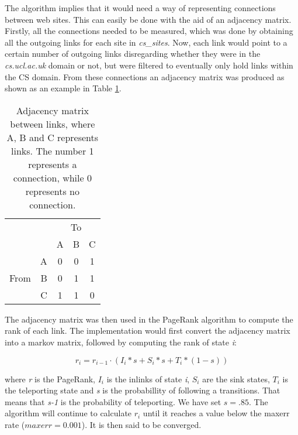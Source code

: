 The algorithm implies that it would need a way of representing connections between web sites. This can easily be done with the aid of an adjacency matrix. Firstly, all the connections needed to be measured, which was done by obtaining all the outgoing links for each site in \emph{cs\_sites}. Now, each link would point to a certain number of outgoing links disregarding whether they were in the \emph{cs.ucl.ac.uk} domain or not, but were filtered to eventually only hold links within the CS domain. From these connections an adjacency matrix was produced as shown as an example in Table \ref{fig:adj_mx}. 

\begin{table}[!h]
  \centering
  \begin{tabular}{|lr|c|c|c|} \cline{3-5}
  \multicolumn{1}{l}{} && \multicolumn{3}{c|}{To} \\ \cline{3-5}
  \multicolumn{1}{l}{} & & A & B & C  \\ \hline
  \multirow{3}{*}{\begin{sideways}From\end{sideways}}
  & \multicolumn{1}{|r|}{A} & 0 & 0 & 1  \\ \cline{2-5}
  & \multicolumn{1}{|r|}{B} & 0 & 1 & 1  \\ \cline{2-5}
  & \multicolumn{1}{|r|}{C} & 1 & 1 & 0  \\ \hline
  \end{tabular}
  \caption{Adjacency matrix between links, where A, B and C represents links. The number 1 represents a connection, while 0 represents no connection.}
  \label{fig:adj_mx}
\end{table}

The adjacency matrix was then used in the PageRank algorithm to compute the rank of each link. The implementation would first convert the adjacency matrix into a markov matrix, followed by computing the rank of state \emph{i}:

$$ r_i = r_{i-1} \cdot (I_i *s + S_i * s + T_i * (1-s)) $$ 

where \emph{r} is the PageRank, \emph{$I_i$} is the inlinks of state \emph{i}, \emph{$S_i$} are the sink states, \emph{$T_i$} is the teleporting state and \emph{s} is the probabillity of following a transitions. That means that \emph{s-1} is the probability of teleporting. We have set $s=.85$. The algorithm will continue to calculate \emph{$r_i$} until it reaches a value below the maxerr rate ($maxerr = 0.001$). It is then said to be converged. 

